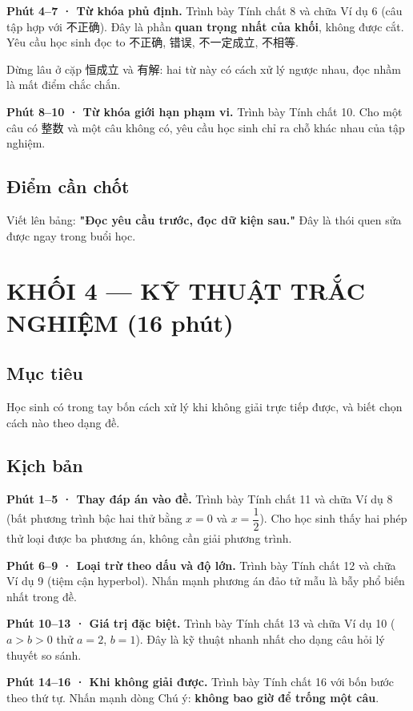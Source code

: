 \documentclass[11pt, a4paper]{article}
\begin{document}
\textbf{Phút 4–7 · Từ khóa phủ định.} Trình bày Tính chất 8 và chữa Ví dụ 6 (câu tập hợp với 不正确). Đây là phần \textbf{quan trọng nhất của khối}, không được cắt. Yêu cầu học sinh đọc to 不正确, 错误, 不一定成立, 不相等.

Dừng lâu ở cặp 恒成立 và 有解: hai từ này có cách xử lý ngược nhau, đọc nhầm là mất điểm chắc chắn.

\textbf{Phút 8–10 · Từ khóa giới hạn phạm vi.} Trình bày Tính chất 10. Cho một câu có 整数 và một câu không có, yêu cầu học sinh chỉ ra chỗ khác nhau của tập nghiệm.

\subsection{Điểm cần chốt}

Viết lên bảng: \textbf{"Đọc yêu cầu trước, đọc dữ kiện sau."} Đây là thói quen sửa được ngay trong buổi học.

\section{KHỐI 4 — KỸ THUẬT TRẮC NGHIỆM (16 phút)}

\subsection{Mục tiêu}

Học sinh có trong tay bốn cách xử lý khi không giải trực tiếp được, và biết chọn cách nào theo dạng đề.

\subsection{Kịch bản}

\textbf{Phút 1–5 · Thay đáp án vào đề.} Trình bày Tính chất 11 và chữa Ví dụ 8 (bất phương trình bậc hai thử bằng $x = 0$ và $x = \dfrac{1}{2}$). Cho học sinh thấy hai phép thử loại được ba phương án, không cần giải phương trình.

\textbf{Phút 6–9 · Loại trừ theo dấu và độ lớn.} Trình bày Tính chất 12 và chữa Ví dụ 9 (tiệm cận hyperbol). Nhấn mạnh phương án đảo tử mẫu là bẫy phổ biến nhất trong đề.

\textbf{Phút 10–13 · Giá trị đặc biệt.} Trình bày Tính chất 13 và chữa Ví dụ 10 ($a > b > 0$ thử $a = 2$, $b = 1$). Đây là kỹ thuật nhanh nhất cho dạng câu hỏi lý thuyết so sánh.

\textbf{Phút 14–16 · Khi không giải được.} Trình bày Tính chất 16 với bốn bước theo thứ tự. Nhấn mạnh dòng Chú ý: \textbf{không bao giờ để trống một câu}.
\end{document}
